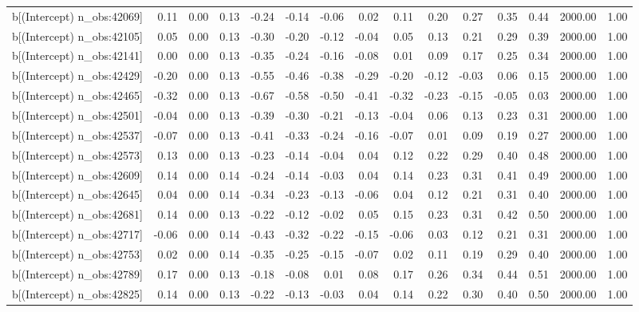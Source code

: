 \begin{table}[ht]
\begin{tabular}{rrrrrrrrrrrrrrr}
  b[(Intercept) n\_obs:42069] & 0.11 & 0.00 & 0.13 & -0.24 & -0.14 & -0.06 & 0.02 & 0.11 & 0.20 & 0.27 & 0.35 & 0.44 & 2000.00 & 1.00 \\ 
  b[(Intercept) n\_obs:42105] & 0.05 & 0.00 & 0.13 & -0.30 & -0.20 & -0.12 & -0.04 & 0.05 & 0.13 & 0.21 & 0.29 & 0.39 & 2000.00 & 1.00 \\ 
  b[(Intercept) n\_obs:42141] & 0.00 & 0.00 & 0.13 & -0.35 & -0.24 & -0.16 & -0.08 & 0.01 & 0.09 & 0.17 & 0.25 & 0.34 & 2000.00 & 1.00 \\ 
  b[(Intercept) n\_obs:42429] & -0.20 & 0.00 & 0.13 & -0.55 & -0.46 & -0.38 & -0.29 & -0.20 & -0.12 & -0.03 & 0.06 & 0.15 & 2000.00 & 1.00 \\ 
  b[(Intercept) n\_obs:42465] & -0.32 & 0.00 & 0.13 & -0.67 & -0.58 & -0.50 & -0.41 & -0.32 & -0.23 & -0.15 & -0.05 & 0.03 & 2000.00 & 1.00 \\ 
  b[(Intercept) n\_obs:42501] & -0.04 & 0.00 & 0.13 & -0.39 & -0.30 & -0.21 & -0.13 & -0.04 & 0.06 & 0.13 & 0.23 & 0.31 & 2000.00 & 1.00 \\ 
  b[(Intercept) n\_obs:42537] & -0.07 & 0.00 & 0.13 & -0.41 & -0.33 & -0.24 & -0.16 & -0.07 & 0.01 & 0.09 & 0.19 & 0.27 & 2000.00 & 1.00 \\ 
  b[(Intercept) n\_obs:42573] & 0.13 & 0.00 & 0.13 & -0.23 & -0.14 & -0.04 & 0.04 & 0.12 & 0.22 & 0.29 & 0.40 & 0.48 & 2000.00 & 1.00 \\ 
  b[(Intercept) n\_obs:42609] & 0.14 & 0.00 & 0.14 & -0.24 & -0.14 & -0.03 & 0.04 & 0.14 & 0.23 & 0.31 & 0.41 & 0.49 & 2000.00 & 1.00 \\ 
  b[(Intercept) n\_obs:42645] & 0.04 & 0.00 & 0.14 & -0.34 & -0.23 & -0.13 & -0.06 & 0.04 & 0.12 & 0.21 & 0.31 & 0.40 & 2000.00 & 1.00 \\ 
  b[(Intercept) n\_obs:42681] & 0.14 & 0.00 & 0.13 & -0.22 & -0.12 & -0.02 & 0.05 & 0.15 & 0.23 & 0.31 & 0.42 & 0.50 & 2000.00 & 1.00 \\ 
  b[(Intercept) n\_obs:42717] & -0.06 & 0.00 & 0.14 & -0.43 & -0.32 & -0.22 & -0.15 & -0.06 & 0.03 & 0.12 & 0.21 & 0.31 & 2000.00 & 1.00 \\ 
  b[(Intercept) n\_obs:42753] & 0.02 & 0.00 & 0.14 & -0.35 & -0.25 & -0.15 & -0.07 & 0.02 & 0.11 & 0.19 & 0.29 & 0.40 & 2000.00 & 1.00 \\ 
  b[(Intercept) n\_obs:42789] & 0.17 & 0.00 & 0.13 & -0.18 & -0.08 & 0.01 & 0.08 & 0.17 & 0.26 & 0.34 & 0.44 & 0.51 & 2000.00 & 1.00 \\ 
  b[(Intercept) n\_obs:42825] & 0.14 & 0.00 & 0.13 & -0.22 & -0.13 & -0.03 & 0.04 & 0.14 & 0.22 & 0.30 & 0.40 & 0.50 & 2000.00 & 1.00 \\ 

\end{tabular}
\end{table}
